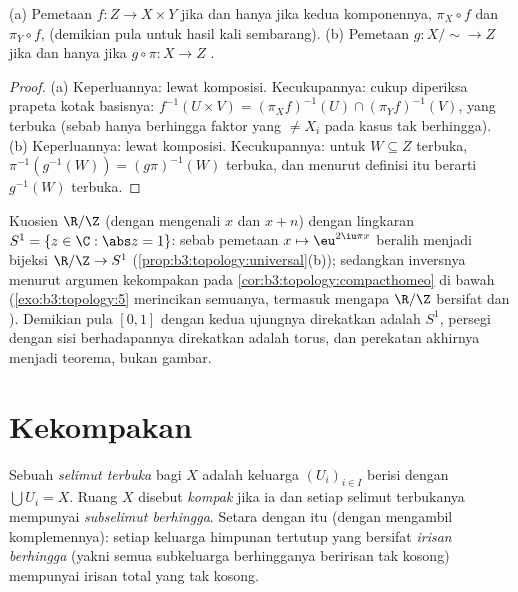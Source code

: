 \begin{proposition}
\label{prop:b3:topology:universal}
(a) Pemetaan $f \colon Z \to X \times Y$  jika dan hanya jika kedua
komponennya, $\pi_X \circ f$ dan $\pi_Y \circ f$,  (demikian pula untuk
hasil kali sembarang).
(b) Pemetaan $g \colon X/{\sim} \to Z$  jika dan hanya jika $g \circ \pi
\colon X \to Z$ .
\end{proposition}

\begin{proof}
(a) Keperluannya: lewat komposisi. Kecukupannya: cukup diperiksa
prapeta kotak basisnya: $f^{-1}(U \times V) = (\pi_Xf)^{-1}(U)
\cap (\pi_Yf)^{-1}(V)$, yang terbuka (sebab hanya berhingga faktor yang $\neq X_i$
pada kasus tak berhingga). (b) Keperluannya: lewat komposisi. Kecukupannya:
untuk $W \subseteq Z$ terbuka, $\pi^{-1}(g^{-1}(W)) = (g\pi)^{-1}(W)$
terbuka, dan menurut definisi  itu berarti
$g^{-1}(W)$ terbuka.
\end{proof}

\begin{example}\label{ex:b3:topology:circle}
Kuosien $\R/\Z$ (dengan mengenali $x$ dan $x + n$) 
dengan lingkaran $S^1 = \{z \in \C : \abs z = 1\}$: sebab pemetaan $x
\mapsto \eu^{2\iu\pi x}$ beralih menjadi bijeksi 
$\R/\Z \to S^1$ (\cref{prop:b3:topology:universal}(b)); sedangkan
inversnya  menurut argumen kekompakan pada
\cref{cor:b3:topology:compacthomeo} di bawah
(\cref{exo:b3:topology:5} merincikan semuanya, termasuk mengapa
$\R/\Z$ bersifat  dan ). Demikian pula $[0,1]$ dengan
kedua ujungnya direkatkan adalah $S^1$, persegi dengan sisi berhadapannya direkatkan
adalah torus, dan perekatan akhirnya menjadi teorema, bukan gambar.
\end{example}

\section{Kekompakan}

\begin{definition}\label{def:b3:topology:compact}
Sebuah \emph{selimut terbuka} bagi $X$ adalah keluarga $(U_i)_{i\in I}$ berisi  dengan $\bigcup U_i = X$. Ruang $X$ disebut
\emph{kompak} jika ia  dan setiap
selimut terbukanya mempunyai \emph{subselimut berhingga}. Setara dengan itu (dengan mengambil
komplemennya): setiap keluarga himpunan tertutup yang bersifat \emph{irisan
berhingga} (yakni semua subkeluarga berhingganya beririsan tak kosong)
mempunyai irisan total yang tak kosong.
\end{definition}

